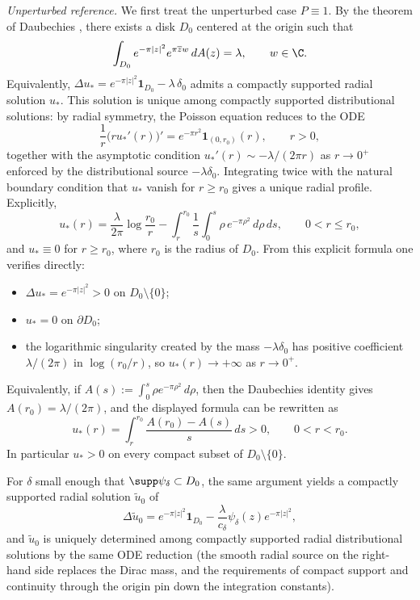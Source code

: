 \smallskip
\emph{Unperturbed reference.} We first treat the unperturbed case $P\equiv 1$. By the theorem of Daubechies \cite{Daubechies}, there exists a disk $D_0$ centered at the origin such that
\[
\int_{D_0} e^{-\pi|z|^2}e^{\pi \overline z w}\,dA(z)=\lambda,
\qquad w\in\C.
\]
Equivalently, $\Delta u_*=e^{-\pi|z|^2}\mathbf 1_{D_0}-\lambda\,\delta_0$ admits a compactly supported radial solution $u_*$. This solution is unique among compactly supported distributional solutions: by radial symmetry, the Poisson equation reduces to the ODE
\[
\frac{1}{r}\big(r u_*'(r)\big)'=e^{-\pi r^2}\mathbf 1_{(0,r_0)}(r),\qquad r>0,
\]
together with the asymptotic condition $u_*'(r)\sim -\lambda/(2\pi r)$ as $r\to 0^+$ enforced by the distributional source \(-\lambda\delta_0\). Integrating twice with the natural boundary condition that $u_*$ vanish for $r\ge r_0$ gives a unique radial profile. Explicitly,
\[
u_*(r)=\frac{\lambda}{2\pi}\log\frac{r_0}{r}-\int_r^{r_0}\frac{1}{s}\int_0^{s}\rho\,e^{-\pi\rho^2}\,d\rho\,ds,
\qquad 0<r\le r_0,
\]
and $u_*\equiv 0$ for $r\ge r_0$, where $r_0$ is the radius of $D_0$. From this explicit formula one verifies directly:
\begin{itemize}
\item $\Delta u_*=e^{-\pi|z|^2}>0$ on $D_0\setminus\{0\}$;
\item $u_*=0$ on $\partial D_0$;
\item the logarithmic singularity created by the mass \(-\lambda\delta_0\) has positive coefficient $\lambda/(2\pi)$ in \(\log(r_0/r)\), so $u_*(r)\to+\infty$ as $r\to 0^+$.
\end{itemize}
Equivalently, if \(A(s):=\int_0^s \rho e^{-\pi\rho^2}\,d\rho\), then the
Daubechies identity gives \(A(r_0)=\lambda/(2\pi)\), and the displayed formula
can be rewritten as
\[
u_*(r)=\int_r^{r_0}\frac{A(r_0)-A(s)}{s}\,ds>0,
\qquad 0<r<r_0.
\]
In particular \(u_*>0\) on every compact subset of \(D_0\setminus\{0\}\).

For $\delta$ small enough that $\supp\psi_\delta\subset D_0$, the same argument yields a compactly supported radial solution $\widetilde u_0$ of
\begin{equation}\label{eq:unperturbed-free-boundary-new}
\Delta \widetilde u_0
=
e^{-\pi|z|^2}\mathbf{1}_{D_0}
-\frac{\lambda}{c_\delta}\psi_\delta(z)e^{-\pi|z|^2},
\end{equation}
and $\widetilde u_0$ is uniquely determined among compactly supported radial distributional solutions by the same ODE reduction (the smooth radial source on the right-hand side replaces the Dirac mass, and the requirements of compact support and continuity through the origin pin down the integration constants).

